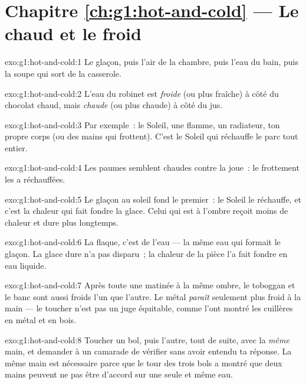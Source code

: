 \section*{Chapitre \ref{ch:g1:hot-and-cold} --- Le chaud et le froid}

\begin{solution}{exo:g1:hot-and-cold:1}
Le glaçon, puis l'air de la chambre, puis l'eau du bain, puis la
soupe qui sort de la casserole.
\end{solution}

\begin{solution}{exo:g1:hot-and-cold:2}
L'eau du robinet est \emph{froide} (ou plus fraîche) à côté du
chocolat chaud, mais \emph{chaude} (ou plus chaude) à côté du jus.
\end{solution}

\begin{solution}{exo:g1:hot-and-cold:3}
Par exemple~: le Soleil, une flamme, un radiateur, ton propre corps
(ou des mains qui frottent). C'est le Soleil qui réchauffe le parc
tout entier.
\end{solution}

\begin{solution}{exo:g1:hot-and-cold:4}
Les paumes semblent chaudes contre la joue~: le frottement les a
réchauffées.
\end{solution}

\begin{solution}{exo:g1:hot-and-cold:5}
Le glaçon au soleil fond le premier~: le Soleil le réchauffe, et
c'est la chaleur qui fait fondre la glace. Celui qui est à l'ombre
reçoit moins de chaleur et dure plus longtemps.
\end{solution}

\begin{solution}{exo:g1:hot-and-cold:6}
La flaque, c'est de l'eau --- la même eau qui formait le glaçon. La
glace dure n'a pas disparu~; la chaleur de la pièce l'a fait fondre
en eau liquide.
\end{solution}

\begin{solution}{exo:g1:hot-and-cold:7}
Après toute une matinée à la même ombre, le toboggan et le banc sont
aussi froids l'un que l'autre. Le métal \emph{paraît} seulement plus
froid à la main --- le toucher n'est pas un juge équitable, comme
l'ont montré les cuillères en métal et en bois.
\end{solution}

\begin{solution}{exo:g1:hot-and-cold:8}
Toucher un bol, puis l'autre, tout de suite, avec la \emph{même}
main, et demander à un camarade de vérifier sans avoir entendu ta
réponse. La même main est nécessaire parce que le tour des trois bols
a montré que deux mains peuvent ne pas être d'accord sur une seule et
même eau.
\end{solution}

